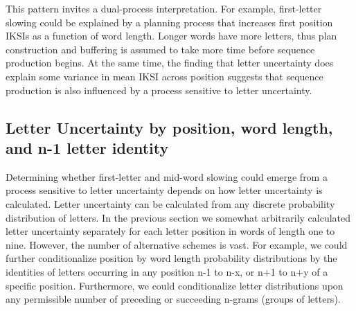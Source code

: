 \documentclass[,man,floatsintext]{apa6}
\begin{document}
This pattern invites a dual-process interpretation. For example, first-letter slowing could be explained by a planning process that increases first position IKSIs as a function of word length. Longer words have more letters, thus plan construction and buffering is assumed to take more time before sequence production begins. At the same time, the finding that letter uncertainty does explain some variance in mean IKSI across position suggests that sequence production is also influenced by a process sensitive to letter uncertainty.

\hypertarget{letter-uncertainty-by-position-word-length-and-n-1-letter-identity}{%
\subsection{Letter Uncertainty by position, word length, and n-1 letter identity}\label{letter-uncertainty-by-position-word-length-and-n-1-letter-identity}}

Determining whether first-letter and mid-word slowing could emerge from a process sensitive to letter uncertainty depends on how letter uncertainty is calculated. Letter uncertainty can be calculated from any discrete probability distribution of letters. In the previous section we somewhat arbitrarily calculated letter uncertainty separately for each letter position in words of length one to nine. However, the number of alternative schemes is vast. For example, we could further conditionalize position by word length probability distributions by the identities of letters occurring in any position n-1 to n-x, or n+1 to n+y of a specific position. Furthermore, we could conditionalize letter distributions upon any permissible number of preceding or succeeding n-grams (groups of letters).
\end{document}
